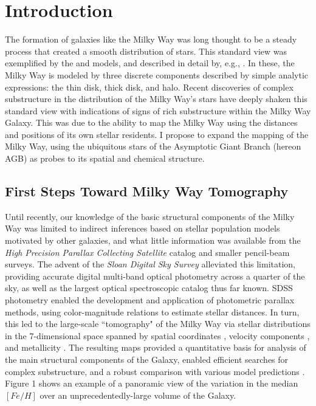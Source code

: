 \section{Introduction}
The formation of galaxies like the Milky Way was long thought to be a steady process that created a smooth distribution of stars. This standard view was exemplified by the \cite{1980ApJS...44...73B} and \cite{1989ARA&A..27..555G} models, and described in detail by, e.g., \cite{1993ARA&A..31..575M}. In these, the Milky Way is modeled by three discrete components described by simple analytic expressions: the thin disk, thick disk, and halo. Recent discoveries of complex substructure in the distribution of the Milky Way's stars \citep[e.g.][]{2000AJ....120..963I,2000ApJ...540..825Y,2001ApJ...554L..33V,2002ApJ...569..245N,2003ApJ...599.1082M,2006ApJ...642L.137B,2006ApJ...651L..29G,2006AJ....132..714V,2008ApJ...673..864J} have deeply shaken this standard view with indications of signs of rich substructure within the Milky Way Galaxy. This was due to the ability to map the Milky Way using the distances and positions of its own stellar residents. I propose to expand the mapping of the Milky Way, using the ubiquitous stars of the Asymptotic Giant Branch (hereon AGB) as probes to its spatial and chemical structure.

\subsection{First Steps Toward Milky Way Tomography}
Until recently, our knowledge of the basic structural components of the Milky Way was limited to indirect inferences based on stellar population models motivated by other galaxies, and what little information was available from the \emph{High Precision Parallax Collecting Satellite} \cite[HIPPARCOS;][]{1984SSRv...39....1K} catalog and smaller pencil-beam surveys.  The advent of the \emph{Sloan Digital Sky Survey} \citep[SDSS;][]{2000AJ....120.1579Y} alleviated this limitation, providing accurate digital multi-band optical photometry across a quarter of the sky, as well as the largest optical spectroscopic catalog thus far known. SDSS photometry enabled the development and application of photometric parallax methods, using color-magnitude relations to estimate stellar distances. In turn, this led to the large-scale ``tomography" of the Milky Way via stellar distributions in the 7-dimensional space spanned by spatial coordinates \citep{2008ApJ...673..864J}, velocity components \citep{2010ApJ...716....1B}, and metallicity \citep{2008ApJ...684..287I}. The resulting maps provided a quantitative basis for analysis of the main structural components of the Galaxy, enabled efficient searches for complex substructure, and a robust comparison with various model predictions \citep{2012ApJ...757..166B,2012ARA&A..50..251I}.  Figure 1 shows an example of a panoramic view of the variation in the median $[Fe/H]$ over an unprecedentedly-large volume of the Galaxy. %

